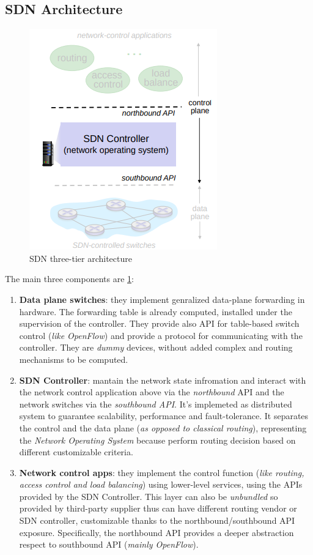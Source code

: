 \documentclass[10pt,a4paper]{report}
\theoremstyle{definition}
\begin{document}
\subsection{SDN Architecture}\label{sec:sdn-architecture}
\begin{figure}[h]
	\centering\includegraphics[scale=0.70]{images/Pasted image 20230322110445.png}
	\caption{SDN three-tier architecture}
	\label{sdn-three-layer-architecture}
\end{figure}

The main three components are \ref{sdn-three-layer-architecture}:
\begin{enumerate}
	\item 
	\textbf{Data plane switches}: they implement genralized data-plane forwarding in hardware. The forwarding table is already computed, installed under the supervision of the controller. They provide also API for table-based switch control (\textit{like OpenFlow}) and provide a protocol for communicating with the controller. They are \textit{dummy} devices, without added complex and routing mechanisms to be computed.
	\item 
	\textbf{SDN Controller}: mantain the network state infromation and interact with the network control application above via the \textit{northbound} API and the network switches via the \textit{southbound API}. It's implemeted as distributed system to guarantee scalability, performance and fault-tolerance. It separates the control and the data plane (\textit{as opposed to classical routing}), representing the \textit{Network Operating System} because perform routing decision based on different customizable criteria.
	\item 
	\textbf{Network control apps}: they implement the control function (\textit{like routing, access control and load balancing}) using lower-level services, using the APIs provided by the SDN Controller. This layer can also be \textit{unbundled} so provided by third-party supplier thus can have different routing vendor or SDN controller, customizable thanks to the northbound/southbound API exposure. Specifically, the northbound API provides a deeper abstraction respect to southbound API (\textit{mainly OpenFlow}).
\end{enumerate}
\end{document}
